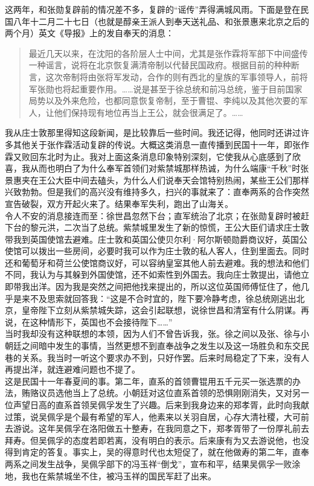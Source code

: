 这两年，和张勋复辟前的情况差不多，复辟的“谣传”弄得满城风雨。下面是登在民国八年十二月二十七日（也就是醇亲王派人到奉天送礼品、和张景惠来北京之后的两个月）英文《导报》上的发自奉天的消息：\\

\begin{quote}
	最近几天以来，在沈阳的各阶层人士中间，尤其是张作霖将军部下中间盛传一种谣言，说将在北京恢复满清帝制以代替民国政府。根据目前的种种断言，这次帝制将由张将军发动，合作的则有西北的皇族的军事领导人，前将军张勋也将起重要作用。……说是甚至于徐总统和前冯总统，鉴于目前国家局势以及外来危险，也都同意恢复帝制，至于曹锟、李纯以及其他次要的军人，让他们保持现有地位再当上王公，就会很满足了。……
\end{quote}

我从庄士敦那里得知这段新闻，是比较靠后一些时间。我还记得，他同时还讲过许多其他关于张作霖活动复辟的传说。大概这类消息一直传播到民国十一年，即张作霖又败回东北时为止。我对上面这条消息印象特别深刻，它使我从心底感到了欣喜，我从而也明白了为什么奉军首领们对紫禁城那样热诚，为什么端康“千秋”时张景惠夹在王公大臣中间去磕头，为什么人们说奉天会馆特别热闹，某些王公们那样兴致勃勃。但是我们的高兴没有维持多久，扫兴的事就来了：直奉两系的合作突然宣告破裂，双方开起火来了。结果奉军失利，跑出了山海关。\\

令人不安的消息接连而至：徐世昌忽然下台；直军统治了北京；在张勋复辟时被赶下台的黎元洪，二次当了总统。紫禁城里发生了新的惊慌，王公大臣们请求庄士敦带我到英国使馆去避难。庄士敦和英国公使贝尔利·阿尔斯顿勋爵商议好，英国公使馆可以拨出一些房间，必要时我可以作为庄士敦的私人客人，住到里面去。同时还和葡萄牙和荷兰公使馆商议好，可以容纳皇室其他人前去避难。我的想法和他们不同，我认为与其躲到外国使馆，还不如索性到外国去。我向庄士敦提出，请他立即带我出洋。因为我是突然之间把他找来提出的，所以这位英国师傅怔住了，他几乎是来不及思索就回答我：“这是不合时宜的，陛下要冷静考虑，徐总统刚逃出北京，皇帝陛下立刻从紫禁城失踪，这会引起联想，说徐世昌和清室有什么阴谋。再说，在这种情形下，英国也不会接待陛下……”\\

当时我却没有这种联想的本领，因为人们不曾告诉我，张。徐之间以及张、徐与小朝廷之间暗中发生的事情，当然更想不到直奉战争之发生以及这一场胜负和东交民巷的关系。我当时一听这个要求办不到，只好作罢。后来时局稳定了下来，没有人再提出洋，就连避难问题也不提了。\\

这是民国十一年春夏间的事。第二年，直系的首领曹锟用五千元买一张选票的办法，贿赂议员选他当上了总统。小朝廷对这位直系首领的恐惧刚刚消失，又对另一位声望日高的直系首领吴佩孚发生了兴趣。后来到我身边来的郑孝胥，此时向我献过策，说吴佩孚是个最有希望的军人，他素来以关羽自居，心存大清社稷，大可前去游说。这年吴佩孚在洛阳做五十整寿，在我同意之下，郑孝胥带了一份厚礼前去拜寿。但吴佩孚的态度若即若离，没有明白的表示。后来康有为又去游说他，也没得到肯定的答复。事实上，吴的得意时代也太短促了，就在他做寿的第二年，直奉两系之间发生战争，吴佩孚部下的冯玉祥“倒戈”，宣布和平，结果吴佩孚一败涂地，我也在紫禁城坐不住，被冯玉祥的国民军赶了出来。\\

